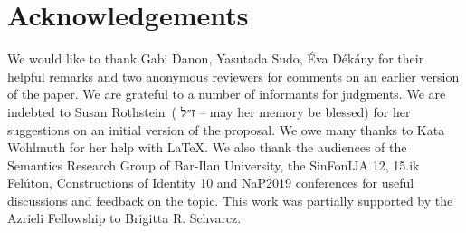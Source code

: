 \documentclass[output=paper]{langscibook}
\begin{document}
\section*{Acknowledgements}
We would like to thank Gabi Danon, Yasutada Sudo, Éva Dékány for their helpful remarks and two anonymous reviewers for comments on an earlier version of the paper. We are grateful to a number of informants for judgments. We are indebted to Susan Rothstein~(\! 
ז״ל
 -- may her memory be blessed) for her suggestions on an initial version of the proposal. We owe many thanks to Kata Wohlmuth for her help with \LaTeX. We also thank the audiences of the Semantics Research Group of Bar-Ilan University, the SinFonIJA 12, 15.ik Felúton, Constructions of Identity 10 and NaP2019 conferences for useful discussions and feedback on the topic. This work was partially supported by the Azrieli Fellowship to Brigitta R. Schvarcz. 

{\sloppy\printbibliography[heading=subbibliography,notkeyword=this]}
\end{document}
